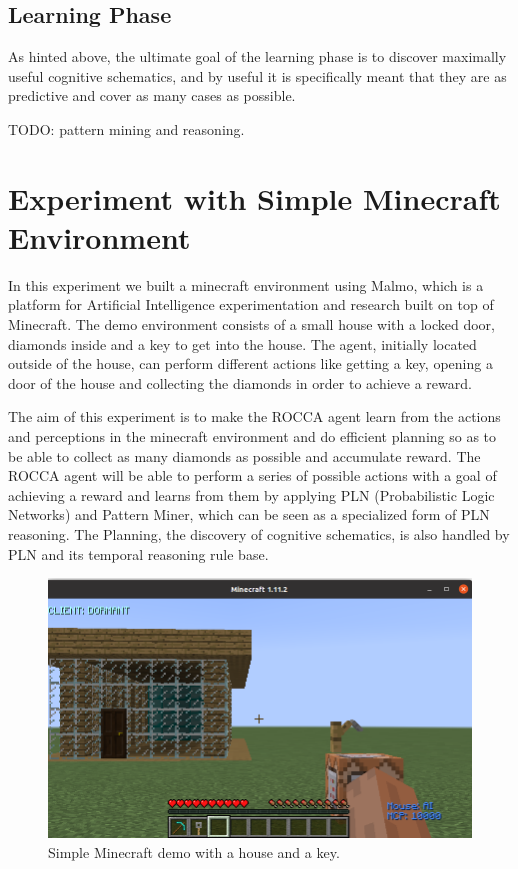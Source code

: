 \documentclass[runningheads]{llncs}
\begin{document}
\subsection{Learning Phase}
As hinted above, the ultimate goal of the learning phase is to
discover maximally useful cognitive schematics, and by useful it is
specifically meant that they are as predictive and cover as many cases
as possible.

TODO: pattern mining and reasoning.

\section{Experiment with Simple Minecraft Environment}

In this experiment we built a minecraft environment using Malmo, which is a platform for Artificial Intelligence experimentation and research built on top of Minecraft. The demo environment consists of a small house with a locked door, diamonds inside and a key to get into the house. The agent, initially located outside of the house, can perform different actions like getting a key, opening a door of the house and collecting the diamonds in order to achieve a reward. \par
The aim of this experiment is to make the ROCCA agent learn from the actions and perceptions in the minecraft environment and do efficient planning so as to be able to collect as many diamonds as possible and accumulate reward. The ROCCA agent will be able to perform a series of possible actions with a goal of achieving a reward and learns from them by applying PLN (Probabilistic Logic Networks) and Pattern Miner, which can be seen as a specialized form of PLN reasoning. The Planning, the discovery of cognitive schematics, is also handled by PLN and its temporal reasoning rule base.

\begin{figure}[htbp]
\centerline{\includegraphics[scale=.2]{simple_demo.png}}
\caption{Simple Minecraft demo with a house and a key.}
\label{fig}
\end{figure}
\end{document}
